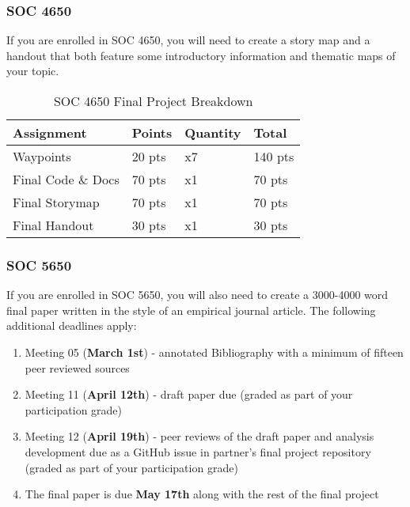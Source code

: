\documentclass[
]{book}
\providecommand{\tightlist}{%
  \setlength{\itemsep}{0pt}\setlength{\parskip}{0pt}}
\begin{document}
\hypertarget{soc-4650}{%
\subsubsection{SOC 4650}\label{soc-4650}}

If you are enrolled in SOC 4650, you will need to create a story map and a handout that both feature some introductory information and thematic maps of your topic.

\begin{table}

\caption{\label{tab:unnamed-chunk-4}SOC 4650 Final Project Breakdown}
\centering
\begin{tabular}[t]{llll}
\toprule
Assignment & Points & Quantity & Total\\
\midrule
Waypoints & 20 pts & x7 & 140 pts\\
Final Code \& Docs & 70 pts & x1 & 70 pts\\
Final Storymap & 70 pts & x1 & 70 pts\\
Final Handout & 30 pts & x1 & 30 pts\\
\bottomrule
\end{tabular}
\end{table}

\hypertarget{soc-5650}{%
\subsubsection{SOC 5650}\label{soc-5650}}

If you are enrolled in SOC 5650, you will also need to create a 3000-4000 word final paper written in the style of an empirical journal article. The following additional deadlines apply:

\begin{enumerate}
\def\labelenumi{\arabic{enumi}.}
\tightlist
\item
  Meeting 05 (\textbf{March 1st}) - annotated Bibliography with a minimum of fifteen peer reviewed sources
\item
  Meeting 11 (\textbf{April 12th}) - draft paper due (graded as part of your participation grade)
\item
  Meeting 12 (\textbf{April 19th}) - peer reviews of the draft paper and analysis development due as a GitHub issue in partner's final project repository (graded as part of your participation grade)
\item
  The final paper is due \textbf{May 17th} along with the rest of the final project
\end{enumerate}
\end{document}

